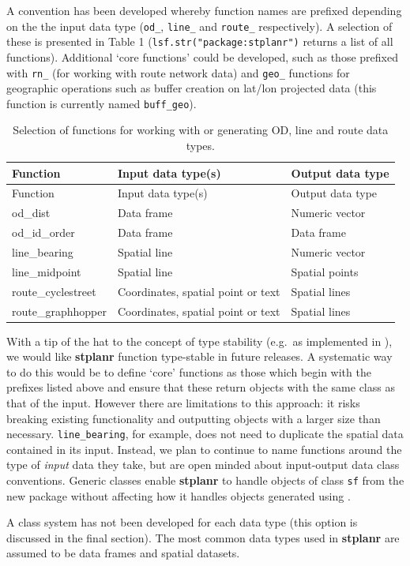A convention has been developed whereby function names are
prefixed depending on the the input data type
(\texttt{od\_}, \texttt{line\_} and
\texttt{route\_} respectively). A selection of these is presented in
Table 1 (\texttt{lsf.str("package:stplanr")} returns a list of all functions).
Additional `core functions' could be developed, such as those
prefixed with \texttt{rn\_} (for working with route network data) and
\texttt{geo\_} functions for geographic operations such as buffer creation
on lat/lon projected data (this function is currently named
\texttt{buff\_geo}).
\begin{longtable}[]{@{}lll@{}}
\caption{Selection of functions for working with or generating OD, line
and route data types.}\tabularnewline
\toprule
Function & Input data type(s) & Output data type\tabularnewline
\midrule
\endfirsthead
\toprule
Function & Input data type(s) & Output data type\tabularnewline
\midrule
\endhead
od\_dist & Data frame & Numeric vector\tabularnewline
od\_id\_order & Data frame & Data frame\tabularnewline
line\_bearing & Spatial line & Numeric vector\tabularnewline
line\_midpoint & Spatial line & Spatial points\tabularnewline
route\_cyclestreet & Coordinates, spatial point or text & Spatial
lines\tabularnewline
route\_graphhopper & Coordinates, spatial point or text & Spatial
lines\tabularnewline
\bottomrule
\end{longtable}

With a tip of the hat to the concept of type stability (e.g.~as
implemented in ), we would like
\textbf{stplanr} function type-stable in future releases.
A systematic way to do this would be to define `core' functions
as those which begin with the prefixes listed above
and ensure that these return objects with the same class as
that of the input. However there are limitations to this approach: it
risks breaking existing functionality and outputting objects with a
larger size than necessary.
\texttt{line\_bearing}, for example, does
not need to duplicate the spatial data contained in its input.
Instead,
we plan to continue to name functions around the type of \emph{input}
data they take, but are open minded about input-output data
class conventions.
Generic classes enable \textbf{stplanr} to
handle objects of class \texttt{sf} from the new  package without affecting how it handles
objects generated using .

A class system has not been developed for each data type (this option is
discussed in the final section). The most common data types used in
\textbf{stplanr} are assumed to be data frames and spatial datasets.

